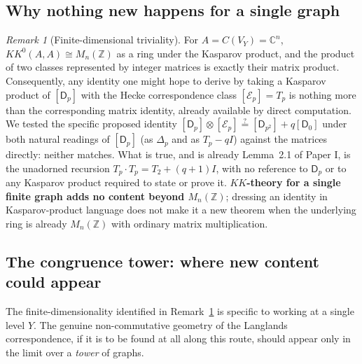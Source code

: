 \documentclass[11pt]{amsart}
\numberwithin{equation}{section}
\theoremstyle{definition}
\theoremstyle{remark}
\newtheorem{remark}[theorem]{Remark}
\newcommand{\Z}{\mathbb{Z}}
\newcommand{\C}{\mathbb{C}}
\newcommand{\cE}{\mathcal{E}}
\begin{document}
\subsection{Why nothing new happens for a single graph}

\begin{remark}[Finite-dimensional triviality]\label{rem:trivial}
For $A=C(V_Y)=\C^n$, $KK^0(A,A)\cong M_n(\Z)$ as a ring under the Kasparov product, and
the product of two classes represented by integer matrices is exactly their matrix
product. Consequently, any identity one might hope to derive by taking a Kasparov
product of $[\mathsf D_p]$ with the Hecke correspondence class $[\cE_p]=T_p$ is nothing
more than the corresponding matrix identity, already available by direct computation. We
tested the specific proposed identity $[\mathsf D_p]\otimes[\cE_p]\overset{?}{=}
[\mathsf D_{p^2}]+q[\mathsf D_0]$ under both natural readings of $[\mathsf D_p]$ (as
$\Delta_p$ and as $T_p-qI$) against the matrices directly: neither matches. What is true,
and is already Lemma~2.1 of Paper I, is the unadorned recursion
$T_p\cdot T_p=T_2+(q+1)I$, with no reference to $\mathsf D_p$ or to any Kasparov product
required to state or prove it. \textbf{$KK$-theory for a single finite graph adds no
content beyond $M_n(\Z)$}; dressing an identity in Kasparov-product language does not
make it a new theorem when the underlying ring is already $M_n(\Z)$ with ordinary matrix
multiplication.
\end{remark}

\subsection{The congruence tower: where new content could appear}\label{subsec:tower}

The finite-dimensionality identified in Remark~\ref{rem:trivial} is specific to working
at a single level $Y$. The genuine non-commutative geometry of the Langlands
correspondence, if it is to be found at all along this route, should appear only in the
limit over a \emph{tower} of graphs.
\end{document}
